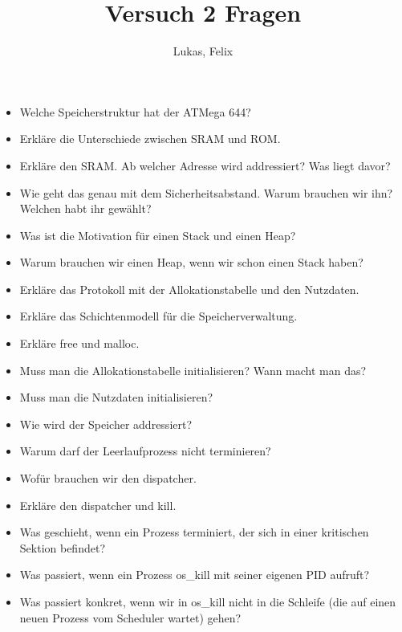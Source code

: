 \documentclass[12pt]{article}
\title{Versuch 2 Fragen}
\author{Lukas, Felix}
\begin{document}
\maketitle

\begin{itemize}
    \item Welche Speicherstruktur hat der ATMega 644? 
    \item Erkläre die Unterschiede zwischen SRAM und ROM.
    \item Erkläre den SRAM. Ab welcher Adresse wird addressiert? Was liegt davor?
    \item Wie geht das genau mit dem Sicherheitsabstand. Warum brauchen wir ihn? Welchen habt ihr gewählt?
    \item Was ist die Motivation für einen Stack und einen Heap?
    \item Warum brauchen wir einen Heap, wenn wir schon einen Stack haben?
    \item Erkläre das Protokoll mit der Allokationstabelle und den Nutzdaten.
    \item Erkläre das Schichtenmodell für die Speicherverwaltung.
    \item Erkläre free und malloc.
    \item Muss man die Allokationstabelle initialisieren? Wann macht man das?
    \item Muss man die Nutzdaten initialisieren?
    \item Wie wird der Speicher addressiert?
    \item Warum darf der Leerlaufprozess nicht terminieren?
    \item Wofür brauchen wir den dispatcher.
    \item Erkläre den dispatcher und kill.
    \item Was geschieht, wenn ein Prozess terminiert, der sich in einer kritischen Sektion befindet?
    \item Was passiert, wenn ein Prozess os_kill  mit seiner eigenen PID aufruft?
    \item Was passiert konkret, wenn wir in os_kill nicht in die Schleife (die auf einen neuen Prozess vom Scheduler wartet) gehen?
\end{itemize}
\end{document}
